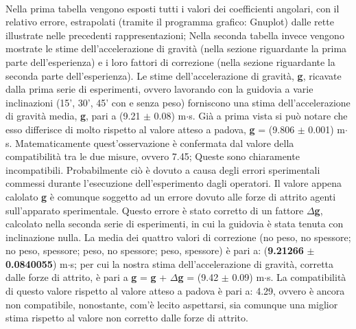 \documentclass[12pt]{article} %
\begin{document}
\paragraph{}
Nella prima tabella vengono esposti tutti i valori dei coefficienti angolari, con il relativo errore, estrapolati (tramite il programma grafico: Gnuplot) dalle rette illustrate nelle precedenti rappresentazioni;
Nella seconda tabella invece vengono mostrate le stime dell'accelerazione di gravità (nella sezione riguardante la prima parte dell'esperienza) e i loro fattori di correzione (nella sezione riguardante la seconda parte dell'esperienza).  
Le stime dell'accelerazione di gravità, \textbf{g}, ricavate dalla prima serie di esperimenti, ovvero lavorando con la guidovia a varie inclinazioni (15', 30', 45' con e senza peso) forniscono una stima dell'accelerazione di gravità media, \textbf{g}, pari a (9.21 $\pm$ 0.08) m$\cdot$s. Già a prima vista si può notare che esso differisce di molto rispetto al valore atteso a padova, \textbf{g} = (9.806 $\pm$ 0.001) m$\cdot$s. Matematicamente quest'osservazione è confermata dal valore della compatibilità tra le due misure, ovvero 7.45; Queste sono chiaramente incompatibili. Probabilmente ciò è dovuto a causa degli errori sperimentali commessi durante l'esecuzione dell'esperimento dagli operatori.
Il valore appena calolato \textbf{g} è comunque soggetto ad un errore dovuto alle forze di attrito agenti sull'apparato sperimentale. Questo errore è stato corretto di un fattore $\Delta$\textbf{g}, calcolato nella seconda serie di esperimenti, in cui la guidovia è stata tenuta con inclinazione nulla. La media dei quattro valori di correzione (no peso, no spessore; no peso, spessore; peso, no spessore; peso, spessore) è pari a: (\textbf{9.21266} $\pm$ \textbf{0.0840055}) m$\cdot$s;
per cui la nostra stima dell'accelerazione di gravità, corretta dalle forze di attrito, è pari a \textbf{g} = \textbf{g} + $\Delta$\textbf{g} = (9.42 $\pm$ 0.09) m$\cdot$s.
La compatibilità di questo valore rispetto al valore atteso a padova è pari a: 4.29, ovvero è ancora non compatibile, nonostante, com'è lecito aspettarsi, sia comunque una miglior stima rispetto al valore non corretto dalle forze di attrito. 
\end{document}
